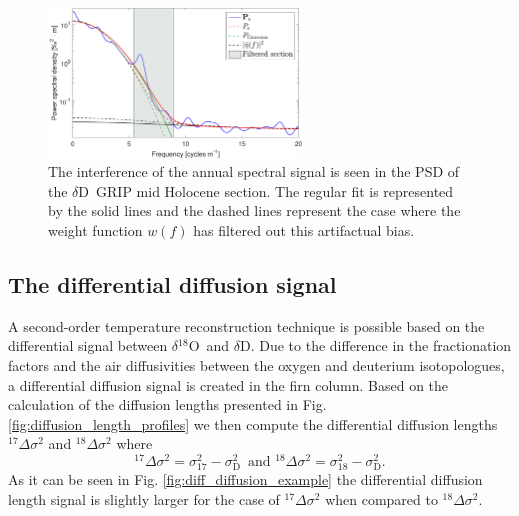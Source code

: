 \documentclass[11pt, draftcls, onecolumn]{IEEEtran} %
\numberwithin{equation}{section}
\numberwithin{table}{section}
\numberwithin{figure}{section}
\newcommand{\delOx}{$\delta{}^{18}\mathrm{O}$}
\newcommand{\delD}{$\delta\mathrm{D}$}
\begin{document}
\begin{figure}[]
	\vspace*{2mm}
	\begin{center}
		\includegraphics[width=0.6\textwidth]{Figure_6}
		\caption{The interference of the annual spectral signal is seen
			in the PSD of the \delD~GRIP mid Holocene section. The regular fit is represented by the solid lines
			and the dashed lines represent the case where the weight function $w(f)$ 
			has filtered out this artifactual bias.} \label{fig:filter_function}
	\end{center}
\end{figure}



\subsection{The differential diffusion signal}\label{sec:diff_diffusion}
A second-order temperature reconstruction technique is possible based on the differential signal between
\delOx~and \delD. Due to the difference in the fractionation factors and the air diffusivities between the oxygen and deuterium isotopologues,
a differential diffusion signal is created in the firn column. Based on the calculation of the diffusion lengths
presented in Fig. \ref{fig:diffusion_length_profiles} we then compute the differential diffusion lengths ${}^{17}\Delta\sigma^2$
and ${}^{18}\Delta\sigma^2$ where
\begin{equation}
{}^{17}\Delta\sigma^2 =  \sigma^2_{17} - \sigma^2_{\mathrm{D}} \mathrm{\,\,\,and\,\,}{}^{18}\Delta\sigma^2 =  \sigma^2_{18} - \sigma^2_{\mathrm{D}}.
\end{equation}
As it can be seen in Fig. \ref{fig:diff_diffusion_example} the differential diffusion length signal is slightly larger for the case 
of ${}^{17}\Delta\sigma^2$ when compared to  ${}^{18}\Delta\sigma^2$. 
\end{document}
